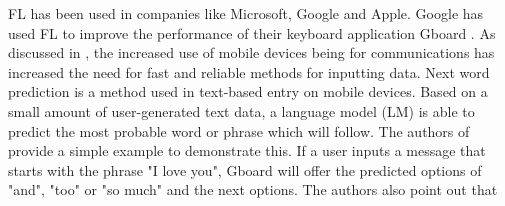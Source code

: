\documentclass[conference]{IEEEtran}
\begin{document}


FL has been used in companies like Microsoft, Google and Apple. Google has used FL to improve the performance of their keyboard application Gboard \cite{b3}. As discussed in \cite{b5}, the increased use of mobile devices being for communications has increased the need for fast and reliable methods for inputting data. Next word prediction is a method used in text-based entry on mobile devices. Based on a small amount of user-generated text data, a language model (LM) is able to predict the most probable word or phrase which will follow. The authors of \cite{b5} provide a simple example to demonstrate this. If a user inputs a message that starts with the phrase "I love you", Gboard will offer the predicted options of "and", "too" or "so much" and the next options. The authors also point out that 

\end{document}
